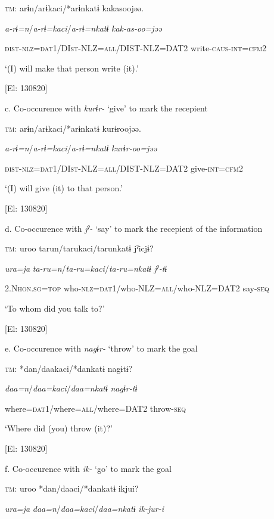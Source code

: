   \textsc{tm}:  arɨn/arɨkaci/*arɨnkatɨ  kakasoojəə.

    \textit{a-rɨ=n}/\textit{a-rɨ=kaci}/\textit{a-rɨ=nkatɨ}  \textit{kak-as-oo=jəə}

    \textsc{dist}-\textsc{nlz}=\textsc{dat}1/DI\textsc{st}-NLZ=\textsc{all}/DIST-NLZ=DAT2  write-\textsc{caus}-\textsc{int}=\textsc{cfm}2

    ‘(I) will make that person write (it).’

    [El: 130820]

  c. Co-occurence with \textit{kurɨr-} ‘give’ to mark the recepient

  \textsc{tm}:  arɨn/arɨkaci/*arɨnkatɨ  kurɨroojəə.

    \textit{a-rɨ=n}/\textit{a-rɨ=kaci}/\textit{a-rɨ=nkatɨ}  \textit{kurɨr-oo=jəə}

    \textsc{dist}-\textsc{nlz}=\textsc{dat}1/DI\textsc{st}-NLZ=\textsc{all}/DIST-NLZ=DAT2  give-\textsc{int}=\textsc{cfm}2

    ‘(I) will give (it) to that person.’

    [El: 130820]

  d. Co-occurence with \textit{jˀ-} ‘say’ to mark the recepient of the information

  \textsc{tm}:  uroo  tarun/tarukaci/tarunkatɨ  jˀicjɨ?

    \textit{ura=ja}  \textit{ta-ru=n}/\textit{ta-ru=kaci}/\textit{ta-ru=nkatɨ}  \textit{jˀ-tɨ}

    2.N\textsc{hon}.\textsc{sg}=\textsc{top}  who-\textsc{nlz}=\textsc{dat}1/who-NLZ=\textsc{all}/who-NLZ=DAT2  say-\textsc{seq}

    ‘To whom did you talk to?’

    [El: 130820]

  e. Co-occurence with \textit{nagɨr-} ‘throw’ to mark the goal

  \textsc{tm}:  *dan/daakaci/*dankatɨ  nagɨtɨ?

    \textit{daa=n}/\textit{daa=kaci}/\textit{daa=nkatɨ}  \textit{nagɨr-tɨ}

     where=\textsc{dat}1/where=\textsc{all}/where=DAT2  throw-\textsc{seq}

     ‘Where did (you) throw (it)?’

    [El: 130820]

  f. Co-occurence with \textit{ik-} ‘go’ to mark the goal

  \textsc{tm}:  uroo  *dan/daaci/*dankatɨ  ikjui?

    \textit{ura=ja}  \textit{daa=n}/\textit{daa=kaci}/\textit{daa=nkatɨ}  \textit{ik-jur-i}

